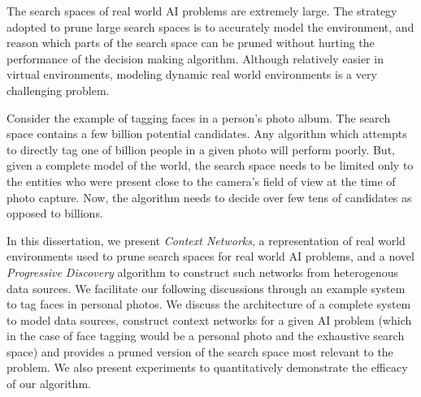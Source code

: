 \thesisabstract
{
The search spaces of real world AI problems are extremely large. The strategy adopted to prune large search spaces is to accurately model the environment, and reason which parts of the search space can be pruned without hurting the performance of the decision making algorithm. Although relatively easier in virtual environments, modeling dynamic real world environments is a very challenging problem.

Consider the example of tagging faces in a person's photo album. The search space contains a few billion potential candidates. Any algorithm which attempts to directly tag one of billion people in a given photo will perform poorly. But, given a complete model of the world, the search space needs to be limited only to the entities who were present close to the camera's field of view at the time of photo capture. Now, the algorithm needs to decide over few tens of candidates as opposed to billions.

In this dissertation, we present \textit{Context Networks}, a representation of real world environments used to prune search spaces for real world AI problems, and a novel \textit{Progressive Discovery} algorithm to construct such networks from heterogenous data sources. We facilitate our following discussions through an example system to tag faces in personal photos. We discuss the architecture of a complete system to model data sources, construct context networks for a given AI problem (which in the case of face tagging would be a personal photo and the exhaustive search space) and provides a pruned version of the search space most relevant to the problem. We also present experiments to quantitatively demonstrate the efficacy of our algorithm.
}


